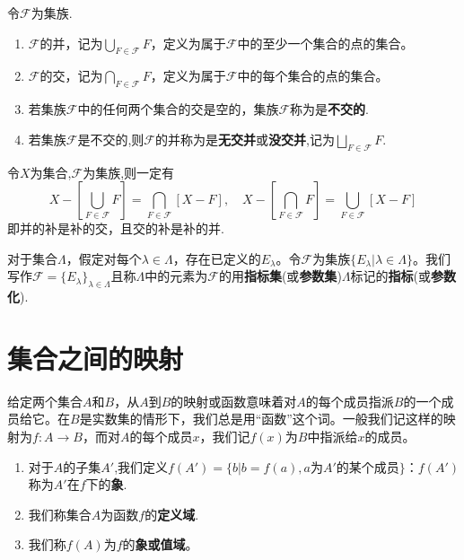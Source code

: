 \documentclass[lang=cn,newtx,10pt,scheme=chinese]{elegantbook}
\begin{document}
\begin{definition}[集族的并和交]\label{definition:集族的并和交}
  令\(\mathcal{F}\)为集族.
  \begin{enumerate}
    \item \(\mathcal{F}\)的并，记为\(\bigcup_{F\in\mathcal{F}}F\)，定义为属于\(\mathcal{F}\)中的至少一个集合的点的集合。

    \item \(\mathcal{F}\)的交，记为\(\bigcap_{F\in\mathcal{F}}F\)，定义为属于\(\mathcal{F}\)中的每个集合的点的集合。
    
    \item 若集族\(\mathcal{F}\)中的任何两个集合的交是空的，集族\(\mathcal{F}\)称为是\textbf{不交的}.

    \item 若集族\(\mathcal{F}\)是不交的,则\(\mathcal{F}\)的并称为是\textbf{无交并}或\textbf{没交并},记为$\bigsqcup_{F\in \mathcal{F}}{F}$.
  \end{enumerate}
\end{definition}

\begin{theorem}[De Morgan等式]\label{theorem:De Morgan等式}
  令$X$为集合,\(\mathcal{F}\)为集族,则一定有
\[
X-\left[\bigcup_{F\in\mathcal{F}}F\right]=\bigcap_{F\in\mathcal{F}}[X- F],\quad X-\left[\bigcap_{F\in\mathcal{F}}F\right]=\bigcup_{F\in\mathcal{F}}[X- F]
\]
即并的补是补的交，且交的补是补的并.
\end{theorem}

\begin{definition}[指标集]\label{definition:指标集}
  对于集合\(\Lambda\)，假定对每个\(\lambda\in\Lambda\)，存在已定义的\(E_{\lambda}\)。令\(\mathcal{F}\)为集族\(\{E_{\lambda}|\lambda\in\Lambda\}\)。我们写作\(\mathcal{F}=\{E_{\lambda}\}_{\lambda\in\Lambda}\)且称$\Lambda$中的元素为\(\mathcal{F}\)的用\textbf{指标集}(或\textbf{参数集})\(\Lambda\)标记的\textbf{指标}(或\textbf{参数化}).
\end{definition}


\section{集合之间的映射}

\begin{definition}[映射的基本概念]\label{definition:映射的基本概念}
  给定两个集合\(A\)和\(B\)，从\(A\)到\(B\)的映射或函数意味着对\(A\)的每个成员指派\(B\)的一个成员给它。在\(B\)是实数集的情形下，我们总是用“函数”这个词。一般我们记这样的映射为\(f:A\to B\)，而对\(A\)的每个成员\(x\)，我们记\(f(x)\)为\(B\)中指派给\(x\)的成员。
  \begin{enumerate}
    \item  对于\(A\)的子集\(A'\),我们定义\(f(A') = \{b|b = f(a), a\text{为}A'\text{的某个成员}\}\)：\(f(A')\)称为\(A'\)在\(f\)下的\textbf{象}.

    \item 我们称集合\(A\)为函数\(f\)的\textbf{定义域}.

    \item 我们称\(f(A)\)为\(f\)的\textbf{象或值域}。
  \end{enumerate}
  
\end{definition}
\end{document}
